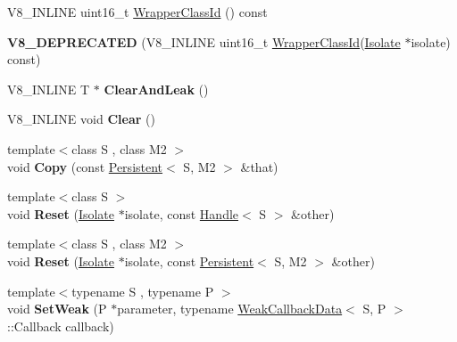 \begin{DoxyCompactItemize}
\item 
V8\+\_\+\+I\+N\+L\+I\+N\+E uint16\+\_\+t \hyperlink{classv8_1_1_persistent_ac5d361fcc04f2f02e30f116e3c3a9699}{Wrapper\+Class\+Id} () const 
\item 
\hypertarget{classv8_1_1_persistent_a7b20cc8079a28ecad67aca44c036a81f}{}{\bfseries V8\+\_\+\+D\+E\+P\+R\+E\+C\+A\+T\+E\+D} (V8\+\_\+\+I\+N\+L\+I\+N\+E uint16\+\_\+t \hyperlink{classv8_1_1_persistent_ac5d361fcc04f2f02e30f116e3c3a9699}{Wrapper\+Class\+Id}(\hyperlink{classv8_1_1_isolate}{Isolate} $\ast$isolate) const)\label{classv8_1_1_persistent_a7b20cc8079a28ecad67aca44c036a81f}

\item 
\hypertarget{classv8_1_1_persistent_ab114b358e4eb09025ef3ca9152e684a3}{}V8\+\_\+\+I\+N\+L\+I\+N\+E T $\ast$ {\bfseries Clear\+And\+Leak} ()\label{classv8_1_1_persistent_ab114b358e4eb09025ef3ca9152e684a3}

\item 
\hypertarget{classv8_1_1_persistent_af1d6cf7fffa469cc2d1539d605db9fd0}{}V8\+\_\+\+I\+N\+L\+I\+N\+E void {\bfseries Clear} ()\label{classv8_1_1_persistent_af1d6cf7fffa469cc2d1539d605db9fd0}

\item 
\hypertarget{classv8_1_1_persistent_ace50a178e3b772f75611e22e41fae974}{}{\footnotesize template$<$class S , class M2 $>$ }\\void {\bfseries Copy} (const \hyperlink{classv8_1_1_persistent}{Persistent}$<$ S, M2 $>$ \&that)\label{classv8_1_1_persistent_ace50a178e3b772f75611e22e41fae974}

\item 
\hypertarget{classv8_1_1_persistent_abe81d9e008a4becee09bcc531786eda4}{}{\footnotesize template$<$class S $>$ }\\void {\bfseries Reset} (\hyperlink{classv8_1_1_isolate}{Isolate} $\ast$isolate, const \hyperlink{classv8_1_1_handle}{Handle}$<$ S $>$ \&other)\label{classv8_1_1_persistent_abe81d9e008a4becee09bcc531786eda4}

\item 
\hypertarget{classv8_1_1_persistent_ab60cedeaccb2d37ab270e8b67a4668e3}{}{\footnotesize template$<$class S , class M2 $>$ }\\void {\bfseries Reset} (\hyperlink{classv8_1_1_isolate}{Isolate} $\ast$isolate, const \hyperlink{classv8_1_1_persistent}{Persistent}$<$ S, M2 $>$ \&other)\label{classv8_1_1_persistent_ab60cedeaccb2d37ab270e8b67a4668e3}

\item 
\hypertarget{classv8_1_1_persistent_ab828a612fde16d07c48909266912bb9b}{}{\footnotesize template$<$typename S , typename P $>$ }\\void {\bfseries Set\+Weak} (P $\ast$parameter, typename \hyperlink{classv8_1_1_weak_callback_data}{Weak\+Callback\+Data}$<$ S, P $>$\+::Callback callback)\label{classv8_1_1_persistent_ab828a612fde16d07c48909266912bb9b}


\end{DoxyCompactItemize}
